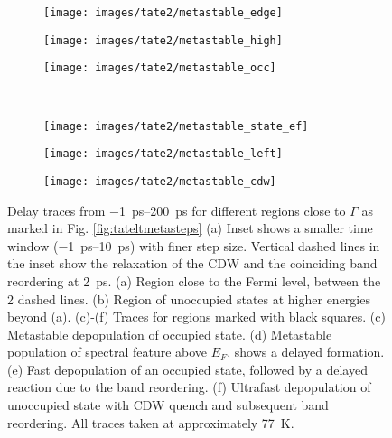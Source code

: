 \begin{figure}[b!]
	\centering
	\begin{subfigure}[b]{0.33\textwidth}
		\texttt{[image: images/tate2/metastable\_edge]}
		\caption{}
	\end{subfigure}
	\begin{subfigure}[b]{0.33\textwidth}
		\texttt{[image: images/tate2/metastable\_high]}
		\caption{}
	\end{subfigure}
	\begin{subfigure}[b]{0.33\textwidth}
		\texttt{[image: images/tate2/metastable\_occ]}
		\caption{}
	\end{subfigure}
	\\
	\begin{subfigure}[b]{0.33\textwidth}
		\texttt{[image: images/tate2/metastable\_state\_ef]}
		\caption{}
	\end{subfigure}
	\begin{subfigure}[b]{0.33\textwidth}
		\texttt{[image: images/tate2/metastable\_left]}
		\caption{}
	\end{subfigure}
	\begin{subfigure}[b]{0.33\textwidth}
		\texttt{[image: images/tate2/metastable\_cdw]}
		\caption{}
	\end{subfigure}
	\caption{Delay traces from \qtyrange{-1}{200}{\pico\second} for different regions close to $\Gamma$ as marked in Fig. \ref{fig:tateltmetasteps} (a) Inset shows a smaller time window (\qtyrange{-1}{10}{\pico\second}) with finer step size. Vertical dashed lines in the inset show the relaxation of the CDW and the coinciding band reordering at \qty{2}{\pico\second}. (a) Region close to the Fermi level, between the 2 dashed lines. (b) Region of unoccupied states at higher energies beyond (a). (c)-(f) Traces for regions marked with black squares. (c) Metastable depopulation of occupied state. (d) Metastable population of spectral feature above $E_F$, shows a delayed formation. (e) Fast depopulation of an occupied state, followed by a delayed reaction due to the band reordering. (f) Ultrafast depopulation of unoccupied state with CDW quench and subsequent band reordering. All traces taken at approximately \qty{77}{\kelvin}.}
	\label{fig:metastableedge}
\end{figure}

